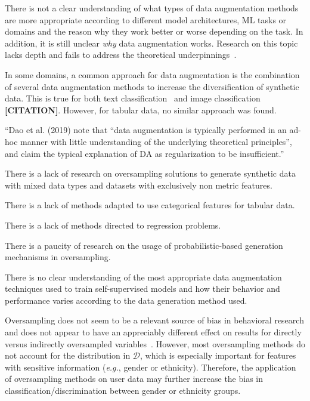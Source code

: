 \documentclass[parskip=full]{scrartcl}
\begin{document}
There is not a clear understanding of what types of data augmentation methods
are more appropriate according to different model architectures, ML tasks or
domains and the reason why they work better or worse depending on the task. 
In addition, it is still unclear \textit{why} data augmentation works.
Research on this topic lacks depth and fails to address the theoretical
underpinnings~\cite{feng2021survey}.

In some domains, a common approach for data augmentation is the combination of
several data augmentation methods to increase the diversification of synthetic
data. This is true for both text classification~\cite{bayer2021survey} and
image classification \textbf{[CITATION]}.  However, for tabular data, no
similar approach was found.


``Dao et al. (2019) note that ``data augmentation is typically performed in an
ad-hoc manner with little understanding of the underlying theoretical
principles'', and claim the typical explanation of DA as regularization to be
insufficient.''~\cite{feng2021survey}

There is a lack of research on oversampling solutions to generate synthetic
data with mixed data types and datasets with exclusively non metric features.

There is a lack of methods adapted to use categorical features for tabular
data.

There is a lack of methods directed to regression problems.

There is a paucity of research on the usage of probabilistic-based generation
mechanisms in oversampling.



There is no clear understanding of the most appropriate data augmentation
techniques used to train self-supervised models and how their behavior and
performance varies according to the data generation method used.


Oversampling does not seem to be a relevant source of bias in behavioral
research and does not appear to have an appreciably different effect on
results for directly versus indirectly oversampled
variables~\cite{hauner2014latent}. However, most oversampling methods do not
account for the distribution in $\mathcal{D}$, which is especially important
for features with sensitive information (\textit{e.g.}, gender or ethnicity).
Therefore, the application of oversampling methods on user data may further
increase the bias in classification/discrimination between gender or ethnicity
groups.
\end{document}
